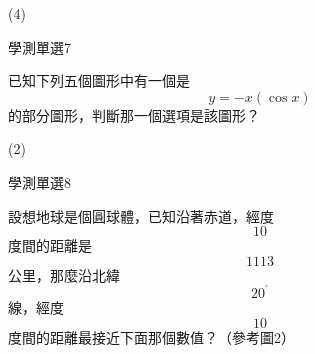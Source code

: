 \begin{QUESTIONS}
\begin{QUESTION}
\begin{QBODY}
        \end{QBODY}
        \begin{QFROMS}
        \end{QFROMS}
        \begin{QTAGS}\end{QTAGS}
        \begin{QANS}
            (4)
        \end{QANS}
        \begin{QSOLLIST}
        \end{QSOLLIST}
        \begin{QEMPTYSPACE}
        \end{QEMPTYSPACE}
    \end{QUESTION}
    \begin{QUESTION}
        \begin{ExamInfo}{85}{學測}{單選}{7}
        \end{ExamInfo}
        \begin{ExamAnsRateInfo}{}{}{}{}
        \end{ExamAnsRateInfo}
        \begin{QBODY}
            已知下列五個圖形中有一個是\[y=-x\left( \cos x \right)\]的部分圖形，判斷那一個選項是該圖形？
        \end{QBODY}
        \begin{QFROMS}
        \end{QFROMS}
        \begin{QTAGS}\end{QTAGS}
        \begin{QANS}
            (2)
        \end{QANS}
        \begin{QSOLLIST}
        \end{QSOLLIST}
        \begin{QEMPTYSPACE}
        \end{QEMPTYSPACE}
    \end{QUESTION}
    \begin{QUESTION}
        \begin{ExamInfo}{85}{學測}{單選}{8}
        \end{ExamInfo}
        \begin{ExamAnsRateInfo}{}{}{}{}
        \end{ExamAnsRateInfo}
        \begin{QBODY}
            設想地球是個圓球體，已知沿著赤道，經度\[10\]度間的距離是\[1113\]公里，那麼沿北緯\[{{20}^{{}^\circ }}\]線，經度\[10\]度間的距離最接近下面那個數值？（參考圖2）

\end{QBODY}
\end{QUESTION}
\end{QUESTIONS}
